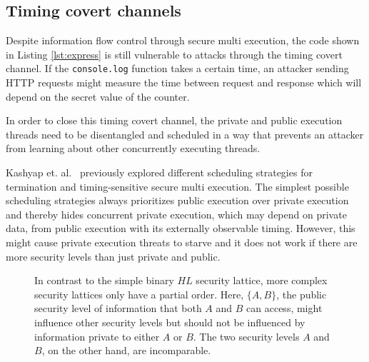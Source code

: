 \documentclass[10pt,preprint]{sigplanconf}
\begin{document}
\subsection{Timing covert channels}

Despite information flow control through secure multi execution, the code shown in Listing \ref{lst:express} is still vulnerable to attacks through the timing covert channel.  If the \verb+console.log+ function takes a certain time, an attacker sending HTTP requests might measure the time between request and response which will depend on the secret value of the counter.

In order to close this timing covert channel, the private and public execution threads need to be disentangled and scheduled in a way that prevents an attacker from learning about other concurrently executing threads.

Kashyap et. al.~\cite{kashyap2011} previously explored different scheduling strategies for termination and timing-sensitive secure multi execution.  The simplest possible scheduling strategies always prioritizes public execution over private execution and thereby hides concurrent private execution, which may depend on private data, from public execution with its externally observable timing.  However, this might cause private execution threats to starve and it does not work if there are more security levels than just private and public.

\begin{figure}
\begin{center}\vspace{-2ex}
\end{center}
\caption{In contrast to the simple binary $HL$ security lattice, more complex security lattices only have a partial order.  Here, $\{ A,B \}$, the public security level of information that both $A$ and $B$ can access, might influence other security levels but should not be influenced by information private to either $A$ or $B$.  The two security levels $A$ and $B$, on the other hand, are incomparable.}
\label{fig:lattice}
\end{figure}
\end{document}
